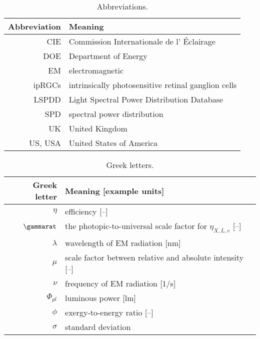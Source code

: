 \begin{table}
\centering %
\caption{Abbreviations.}
\begin{tabular}{r l}
\toprule
Abbreviation & Meaning \\
\midrule
CIE & Commission Internationale de l' \'{E}clairage \\
DOE & Department of Energy \\
EM & electromagnetic \\
ipRGCs & intrinsically photosensitive retinal ganglion cells \\
LSPDD & Light Spectral Power Distribution Database \\
SPD & spectral power distribution \\
UK & United Kingdom \\
US, USA & United States of America \\
\bottomrule
\end{tabular}
\label{tab:abbreviations}
\end{table}



\begin{table}
\centering %
\caption{Greek letters.}
\begin{tabular}{r l}
  \toprule
  Greek letter & Meaning [example units] \\
  \midrule
  $\eta$ & efficiency [--] \\
  $\gammarat$ & the photopic-to-universal scale factor for $\eta_{X,L,v}$ [--] \\
  $\lambda$ & wavelength of EM radiation [nm] \\
  $\mu$ & scale factor between relative and absolute intensity [--] \\
  $\nu$ & frequency of EM radiation [1/s] \\
  $\Phi_{pl}$ & luminous power [lm] \\
  $\phi$ & exergy-to-energy ratio [--] \\
  $\sigma$ & standard deviation \\
  \bottomrule
\end{tabular}
\label{tab:greek}
\end{table}


  
